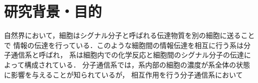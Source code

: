 \documentclass[twocolumn]{jarticle}
\begin{document}
\maketitle

\section{研究背景・目的}
自然界において，細胞はシグナル分子と呼ばれる伝達物質を別の細胞に送ることで
情報の伝達を行っている．このような細胞間の情報伝達を相互に行う系は分子通信系と呼ばれ，
系は細胞内での化学反応と細胞間のシグナル分子の伝達によって構成されている．
分子通信系では，系内部の細胞の濃度が系全体の状態に影響を与えることが知られているが，
相互作用を行う分子通信系において

\end{document}
